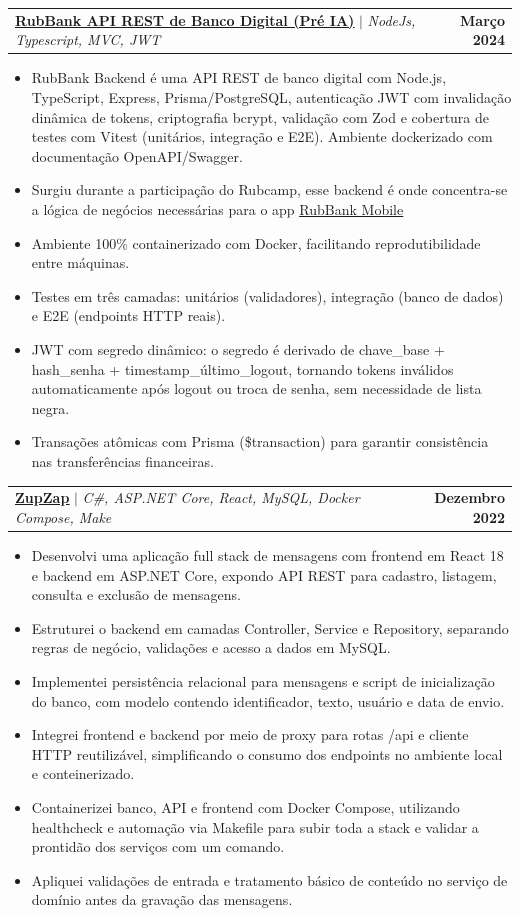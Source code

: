 \documentclass[letterpaper,11pt]{article}
\makeatletter
\newcommand{\resumeItem}[1]{
  \item\small{
    {#1 \vspace{-2pt}}
  }
}
\newcommand{\resumeProjectHeading}[2]{
    \item
    \begin{tabular*}{1.001\textwidth}{l@{\extracolsep{\fill}}r}
      \small#1 & \textbf{\small #2}\\
    \end{tabular*}\vspace{-7pt}
}
\newcommand{\resumeItemListStart}{\begin{itemize}}
\newcommand{\resumeItemListEnd}{\end{itemize}\vspace{-5pt}}
\makeatother
\begin{document}
      \resumeProjectHeading
          {\textbf{\href{https://github.com/elvitin/rubbank-backend}{\underline{RubBank API REST de Banco Digital (Pré IA)}}} $|$ \emph{NodeJs, Typescript, MVC, JWT}}{Março 2024}
          \resumeItemListStart
            \resumeItem{RubBank Backend é uma API REST de banco digital com Node.js, TypeScript, Express, Prisma/PostgreSQL, autenticação JWT com invalidação dinâmica de tokens, criptografia bcrypt, validação com Zod e cobertura de testes com Vitest (unitários, integração e E2E). Ambiente dockerizado com documentação OpenAPI/Swagger.}
            \resumeItem{Surgiu durante a participação do Rubcamp, esse backend é onde concentra-se a lógica de negócios necessárias para o app \href{https://github.com/elvitin/rubbank-mobile/}{\underline{RubBank Mobile}} }
            \resumeItem{Ambiente 100\% containerizado com Docker, facilitando reprodutibilidade entre máquinas.}
            \resumeItem{Testes em três camadas: unitários (validadores), integração (banco de dados) e E2E (endpoints HTTP reais).}
            \resumeItem{JWT com segredo dinâmico: o segredo é derivado de chave\_base + hash\_senha + timestamp\_último\_logout, tornando tokens inválidos automaticamente após logout ou troca de senha, sem necessidade de lista negra.}
            \resumeItem{Transações atômicas com Prisma (\$transaction) para garantir consistência nas transferências financeiras.}
          \resumeItemListEnd
          \vspace{-13pt}
            
        \resumeProjectHeading
    {\textbf{\href{https://github.com/elvitin/zupzap}{\underline{ZupZap}}} $|$ \emph{C\#, ASP.NET Core, React, MySQL, Docker Compose, Make}}{Dezembro 2022}
    \resumeItemListStart
      \resumeItem{Desenvolvi uma aplicação full stack de mensagens com frontend em React 18 e backend em ASP.NET Core, expondo API REST para cadastro, listagem, consulta e exclusão de mensagens.}
      \resumeItem{Estruturei o backend em camadas Controller, Service e Repository, separando regras de negócio, validações e acesso a dados em MySQL.}
      \resumeItem{Implementei persistência relacional para mensagens e script de inicialização do banco, com modelo contendo identificador, texto, usuário e data de envio.}
      \resumeItem{Integrei frontend e backend por meio de proxy para rotas /api e cliente HTTP reutilizável, simplificando o consumo dos endpoints no ambiente local e conteinerizado.}
      \resumeItem{Containerizei banco, API e frontend com Docker Compose, utilizando healthcheck e automação via Makefile para subir toda a stack e validar a prontidão dos serviços com um comando.}
      \resumeItem{Apliquei validações de entrada e tratamento básico de conteúdo no serviço de domínio antes da gravação das mensagens.}
    \resumeItemListEnd
    \vspace{-13pt}
    
\end{document}

